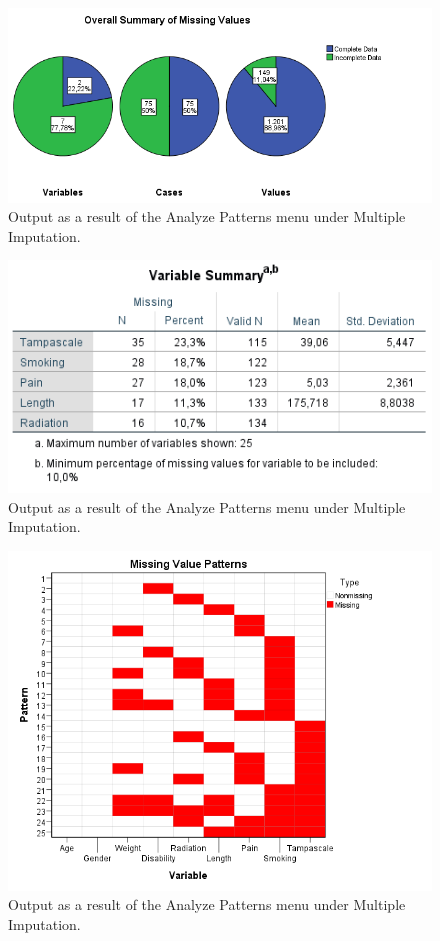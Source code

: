 \documentclass[
]{book}
\begin{document}
\begin{figure}

{\centering \includegraphics[width=0.9\linewidth]{images/fig2.6a} 

}

\caption{Output as a result of the Analyze Patterns menu under Multiple Imputation.}\label{fig:fig2-61}
\end{figure}
\begin{figure}

{\centering \includegraphics[width=0.9\linewidth]{images/fig2.6b} 

}

\caption{Output as a result of the Analyze Patterns menu under Multiple Imputation.}\label{fig:fig2-62}
\end{figure}
\begin{figure}

{\centering \includegraphics[width=0.9\linewidth]{images/fig2.6c} 

}

\caption{Output as a result of the Analyze Patterns menu under Multiple Imputation.}\label{fig:fig2-63}
\end{figure}
\end{document}

